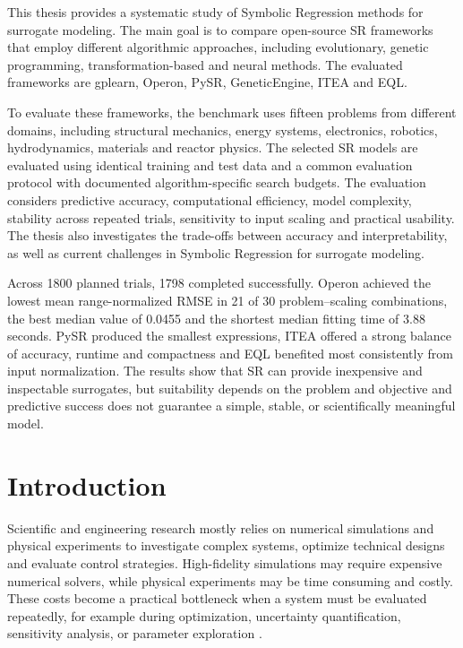 \documentclass[12pt,oneside,bibtotoc,liststotoc]{scrbook}
\begin{document}
This thesis provides a systematic study of Symbolic Regression methods for surrogate modeling. The main goal is to compare open-source SR frameworks that employ different algorithmic approaches, including evolutionary, genetic programming, transformation-based and neural methods. The evaluated frameworks are gplearn, Operon, PySR, GeneticEngine, ITEA and EQL.

To evaluate these frameworks, the benchmark uses fifteen problems from different domains, including structural mechanics, energy systems, electronics, robotics, hydrodynamics, materials and reactor physics. The selected SR models are evaluated using identical training and test data and a common evaluation protocol with documented algorithm-specific search budgets. The evaluation considers predictive accuracy, computational efficiency, model complexity, stability across repeated trials, sensitivity to input scaling and practical usability. The thesis also investigates the trade-offs between accuracy and interpretability, as well as current challenges in Symbolic Regression for surrogate modeling.

Across 1800 planned trials, 1798 completed successfully. Operon achieved the lowest mean range-normalized RMSE in 21 of 30 problem--scaling combinations, the best median value of 0.0455 and the shortest median fitting time of 3.88 seconds. PySR produced the smallest expressions, ITEA offered a strong balance of accuracy, runtime and compactness and EQL benefited most consistently from input normalization. The results show that SR can provide inexpensive and inspectable surrogates, but suitability depends on the problem and objective and predictive success does not guarantee a simple, stable, or scientifically meaningful model.

\tableofcontents
\listoffigures
\listoftables
\newpage
\setcounter{page}{1}

\chapter{Introduction}

Scientific and engineering research mostly relies on numerical simulations and physical experiments to investigate complex systems, optimize technical designs and evaluate control strategies. High-fidelity simulations may require expensive numerical solvers, while physical experiments may be time consuming and costly. These costs become a practical bottleneck when a system must be evaluated repeatedly, for example during optimization, uncertainty quantification, sensitivity analysis, or parameter exploration \cite{alizadeh2020managing}.
\end{document}
